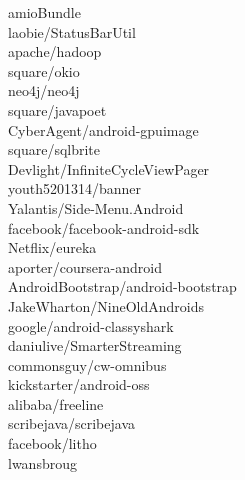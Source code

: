 \documentclass[twoside]{praca}
\begin{document}
\begin{multicols}{3}
amioBundle\\laobie/StatusBarUtil\\apache/hadoop\\square/okio\\neo4j/neo4j\\square/javapoet\\CyberAgent/android-gpuimage\\square/sqlbrite\\Devlight/InfiniteCycle\-View\-Pager\\youth5201314/banner\\Yalantis/Side-Menu.Android\\facebook/facebook-android-sdk\\Netflix/eureka\\aporter/coursera-android\\AndroidBootstrap/android-bootstrap\\JakeWharton/NineOld\-Androids\\google/android-classyshark\\daniulive/SmarterStreaming\\commonsguy/cw-omnibus\\kickstarter/android-oss\\alibaba/freeline\\scribejava/scribejava\\facebook/litho\\lwansbroug
\end{multicols}
\end{document}

